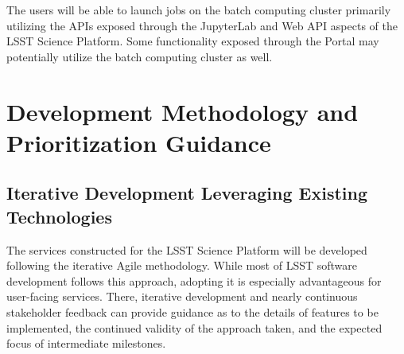 \documentclass[DM,lsstdraft,toc]{lsstdoc}
\begin{document}
The users will be able to launch jobs on the batch computing cluster primarily utilizing the APIs exposed through the JupyterLab and Web API aspects of the LSST Science Platform. Some functionality exposed through the Portal may potentially utilize the batch computing cluster as well.

%
%
%
%
%

\section{Development Methodology and Prioritization Guidance}

\subsection{Iterative Development Leveraging Existing Technologies }

The services constructed for the LSST Science Platform will be developed following the iterative Agile methodology. While most of LSST software development follows this approach, adopting it is especially advantageous for user-facing services. There, iterative development and nearly continuous stakeholder feedback can provide guidance as to the details of features to be implemented, the continued validity of the approach taken, and the expected focus of intermediate milestones.
\end{document}
